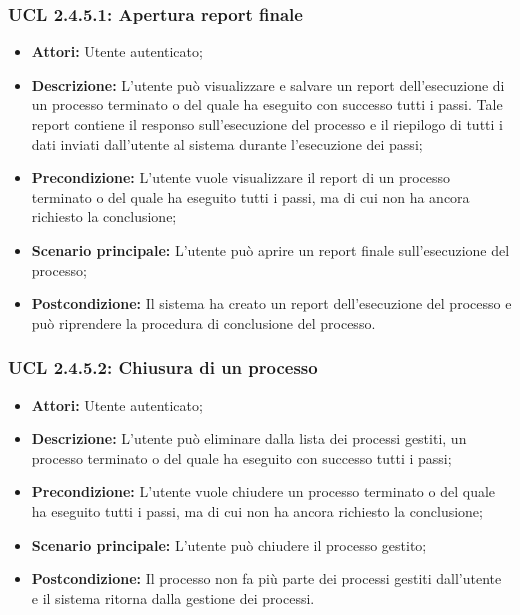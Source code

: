 \hypertarget{L2.4.5.1}{}
\subsubsection{UCL 2.4.5.1: Apertura report finale}
\begin{itemize}
\item \textbf{Attori:} Utente autenticato;
\item \textbf{Descrizione:} L'utente può visualizzare e salvare un report dell'esecuzione di un processo terminato o del quale ha eseguito con successo tutti i passi. Tale report contiene il responso sull'esecuzione del processo e il riepilogo di tutti i dati inviati dall'utente al sistema durante l'esecuzione dei passi;
\item \textbf{Precondizione:} L'utente vuole visualizzare il report di un processo terminato o del quale ha eseguito tutti i passi, ma di cui non ha ancora richiesto la conclusione;
\item \textbf{Scenario principale:} L'utente può aprire un report finale sull'esecuzione del processo;
\item \textbf{Postcondizione:} Il sistema ha creato un report dell'esecuzione del processo e può riprendere la procedura di conclusione del processo.
\end{itemize}

\hypertarget{L2.4.5.2}{}
\subsubsection{UCL 2.4.5.2: Chiusura di un processo}
\begin{itemize}
\item \textbf{Attori:} Utente autenticato;
\item \textbf{Descrizione:} L'utente può eliminare dalla lista dei processi gestiti, un processo terminato o del quale ha eseguito con successo tutti i passi;
\item \textbf{Precondizione:} L'utente vuole chiudere un processo terminato o del quale ha eseguito tutti i passi, ma di cui non ha ancora richiesto la conclusione;
\item \textbf{Scenario principale:} L'utente può chiudere il processo gestito;
\item \textbf{Postcondizione:} Il processo non fa più parte dei processi gestiti dall'utente e il sistema ritorna dalla gestione dei processi.
\end{itemize}

